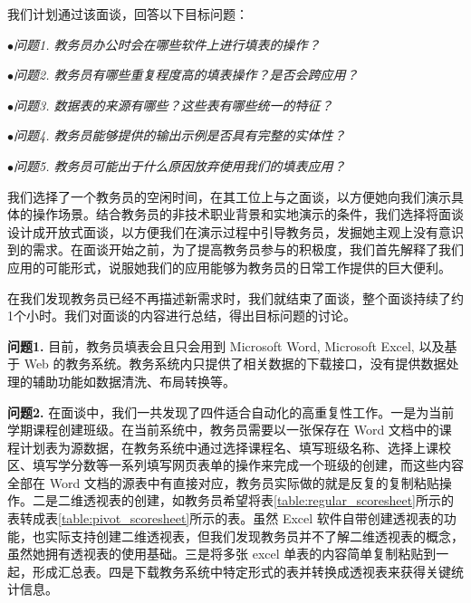 \documentclass[design, pageheader]{njubachelor}
\begin{document}
我们计划通过该面谈，回答以下目标问题：

$\bullet${\itshape 问题1. 教务员办公时会在哪些软件上进行填表的操作？}

$\bullet${\itshape 问题2. 教务员有哪些重复程度高的填表操作？是否会跨应用？}

$\bullet${\itshape 问题3. 数据表的来源有哪些？这些表有哪些统一的特征？}

$\bullet${\itshape 问题4. 教务员能够提供的输出示例是否具有完整的实体性？}

$\bullet${\itshape 问题5. 教务员可能出于什么原因放弃使用我们的填表应用？}

我们选择了一个教务员的空闲时间，在其工位上与之面谈，以方便她向我们演示具体的操作场景。结合教务员的非技术职业背景和实地演示的条件，我们选择将面谈设计成开放式面谈，以方便我们在演示过程中引导教务员，发掘她主观上没有意识到的需求。在面谈开始之前，为了提高教务员参与的积极度，我们首先解释了我们应用的可能形式，说服她我们的应用能够为教务员的日常工作提供的巨大便利。

在我们发现教务员已经不再描述新需求时，我们就结束了面谈，整个面谈持续了约1个小时。我们对面谈的内容进行总结，得出目标问题的讨论。

{\bfseries 问题1.} 目前，教务员填表会且只会用到 Microsoft Word, Microsoft Excel, 以及基于 Web 的教务系统。教务系统内只提供了相关数据的下载接口，没有提供数据处理的辅助功能如数据清洗、布局转换等。

{\bfseries 问题2.} 在面谈中，我们一共发现了四件适合自动化的高重复性工作。一是为当前学期课程创建班级。在当前系统中，教务员需要以一张保存在 Word 文档中的课程计划表为源数据，在教务系统中通过选择课程名、填写班级名称、选择上课校区、填写学分数等一系列填写网页表单的操作来完成一个班级的创建，而这些内容全部在 Word 文档的源表中有直接对应，教务员实际做的就是反复的复制粘贴操作。二是二维透视表的创建，如教务员希望将表\ref{table:regular_scoresheet}所示的表转成表\ref{table:pivot_scoresheet}所示的表。虽然 Excel 软件自带创建透视表的功能，也实际支持创建二维透视表，但我们发现教务员并不了解二维透视表的概念，虽然她拥有透视表的使用基础。三是将多张 excel 单表的内容简单复制粘贴到一起，形成汇总表。四是下载教务系统中特定形式的表并转换成透视表来获得关键统计信息。
\end{document}
